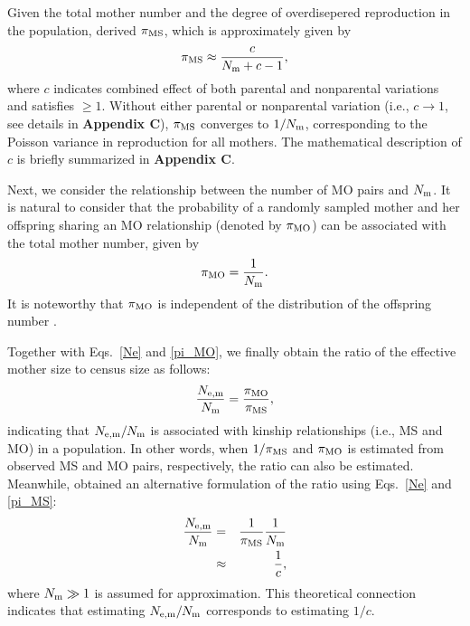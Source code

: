 \documentclass[12pt, English]{article}
\begin{document}
\begin{spacing}{1.9}
Given the total mother number and the degree of overdisepered reproduction in the population, \cite{Akita_2019} derived $\pi_{\rm MS}$, which is approximately given by
\begin{equation}
\pi_{\rm MS} \approx \frac{c}{N_{\rm m}+c-1},
\label{pi_MS}
\end{equation}
where $c$ indicates combined effect of both parental and nonparental variations and satisfies $\ge1$. Without either parental or nonparental variation (i.e., $c\to1$, see details in {\bf Appendix C}), $\pi_{\rm MS}$ converges to $1/N_{\rm m}$, corresponding to the Poisson variance in reproduction for all mothers. The mathematical description of $c$ is briefly summarized in {\bf Appendix C}.

Next, we consider the relationship between the number of MO pairs and $N_{\rm m}$. It is natural to consider that the probability of a randomly sampled mother and her offspring sharing an MO relationship (denoted by $\pi_{\rm MO}$) can be associated with the total mother number, given by
\begin{equation}
\pi_{\rm MO} = \frac{1}{N_{\rm m}}.
\label{pi_MO}
\end{equation} 
It is noteworthy that $\pi_{\rm MO}$ is independent of the distribution of the offspring number \cite[]{Akita2018}.

Together with Eqs.~\ref{Ne} and \ref{pi_MO}, we finally obtain the ratio of the effective mother size to census size as follows: 
\begin{equation}
\frac{N_{\rm e,m}}{N_{\rm m}} = \frac{\pi_{\rm MO}}{\pi_{\rm MS}},
\label{NeN}
\end{equation}
indicating that $N_{\rm e,m}/N_{\rm m}$ is associated with kinship relationships (i.e., MS and MO) in a population. In other words, when $1/\pi_{\rm MS}$ and $\pi_{\rm MO}$ is estimated from observed MS and MO pairs, respectively, the ratio can also be estimated. Meanwhile, \cite{Akita_2019} obtained an alternative formulation of the ratio using Eqs.~\ref{Ne} and \ref{pi_MS}: 
\begin{eqnarray}
\frac{N_{\rm e,m}}{N_{\rm m}} &=& \frac{1}{\pi_{\rm MS}} \frac{1}{N_{\rm m}} \nonumber\\
&\approx& \frac{1}{c},  
\label{NeN}
\end{eqnarray}
where $N_{\rm m} \gg 1$ is assumed for approximation. This theoretical connection indicates that estimating $N_{\rm e,m}/N_{\rm m}$ corresponds to estimating $1/c$. 


\end{spacing}
\end{document}
